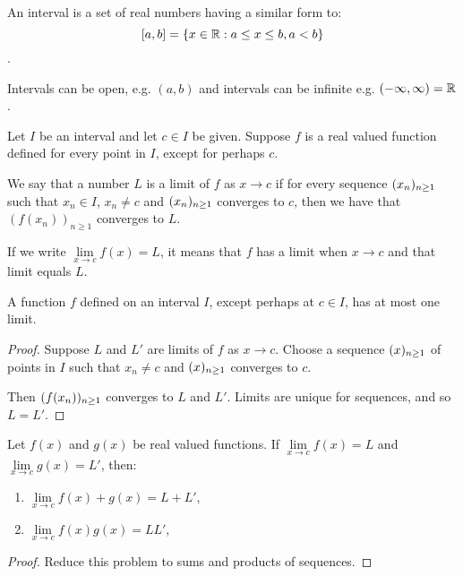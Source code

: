 
\begin{defn}[Interval]
    An interval is a set of real numbers having a similar form to: 
    \[[a,b] = \{x \in \mathbb{R} : a \leq x \leq b, a<b \}\].

    Intervals can be open, e.g. $(a,b)$ and intervals can be infinite e.g. 
    $(-\infty, \infty ) = \mathbb{R}$.
\end{defn}


\begin{defn}[Limit]
    Let $I$ be an interval and let $c \in I$ be given. Suppose $f$ is a real valued
    function defined for every point in $I$, except for perhaps $c$.

    We say that a number $L$ is a limit of $f$ as $x \rightarrow c$ if for every 
    sequence $(x_n)_{n \geq 1}$ such that $x_n \in I$, $x_n \neq c$ and $(x_n)_{n \geq 1}$
    converges to $c$, then we have that $(f(x_n))_{n \geq 1}$ converges to $L$.

    If we write $\lim\limits_{x \to c} f(x) = L $, it means that $f$ has a limit
    when $x \rightarrow c$ and that limit equals $L$.
\end{defn}


\begin{prop}
    A function $f$ defined on an interval $I$, except perhaps at $c \in I$, has
    at most one limit.
\end{prop}
\begin{proof}
    Suppose $L$ and $L'$ are limits of $f$ as $x \rightarrow c$. Choose a 
    sequence $(x)_{n \geq 1}$ of points in $I$ such that $x_n \neq c$ and $(x)_{n \geq 1}$ 
    converges to $c$.

    Then $(f(x_n))_{n \geq 1}$ converges to $L$ and $L'$. Limits are unique for 
    sequences, and so $L = L'$.
\end{proof}


\begin{prop}
    Let $f(x)$ and $g(x)$ be real valued functions. If $\lim\limits_{x \to c} f(x) = L $
    and  $\lim\limits_{x \to c} g(x) = L' $, then:

    \begin{enumerate}
        \item $\lim\limits_{x \to c} f(x)+g(x) = L+L'$,
        \item $\lim\limits_{x \to c} f(x)g(x) = LL'$,
    \end{enumerate}
\end{prop}
\begin{proof}
    Reduce this problem to sums and products of sequences.
\end{proof}


